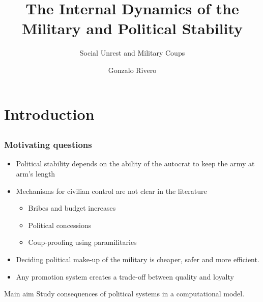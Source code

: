 \documentclass[9pt]{beamer}
\title{The Internal Dynamics of the Military and Political Stability}
\subtitle{Social Unrest and Military Coups}
\author{Gonzalo Rivero}
\institute{YouGov America}
\date{}
\begin{document}
 
	
\begin{frame}[plain]
  \titlepage  
\end{frame}

\section{Introduction}
\subsection{}

\begin{frame}
  \frametitle{Motivating questions} 
  \begin{itemize}
  \item Political stability depends on the ability of the autocrat to keep the
    army at arm's length
  \item Mechanisms for civilian control are not clear in the literature
    \begin{itemize}
    \item Bribes and budget increases
    \item Political concessions
    \item Coup-proofing using paramilitaries
    \end{itemize}
  \item Deciding political make-up of the military is cheaper, safer and more
    efficient.
  \item Any promotion system creates a trade-off between quality and loyalty
  \end{itemize}
  \begin{block}{Main aim}
    Study consequences of political systems in a computational model.
  \end{block}
  
\end{frame}
\end{document}
